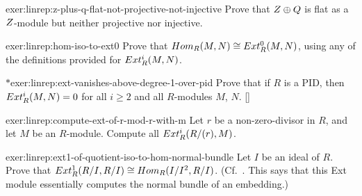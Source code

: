 \begin{exer}{}{exer:linrep:z-plus-q-flat-not-projective-not-injective}
  Prove that $Z \oplus Q$ is flat as a $Z$-module but neither
  projective nor injective.
\end{exer}

\begin{exer}{}{exer:linrep:hom-iso-to-ext0}
  Prove that $Hom_R(M, N) \cong Ext^0_R(M, N)$, using any of the
  definitions provided for $Ext^i_R(M, N)$.
\end{exer}

\begin{exer}{$*$}{exer:linrep:ext-vanishes-above-degree-1-over-pid}
  Prove that if $R$ is a PID, then $Ext^i_R(M, N) = 0$ for all
  $i \geq 2$ and all $R$-modules $M$,
  $N$. []
\end{exer}

\begin{exer}{}{exer:linrep:compute-ext-of-r-mod-r-with-m}
  Let $r$ be a non-zero-divisor in $R$, and let $M$ be an
  $R$-module. Compute all $Ext^i_R(R/(r), M)$.
\end{exer}

\begin{exer}{}{exer:linrep:ext1-of-quotient-iso-to-hom-normal-bundle}
  Let $I$ be an ideal of $R$. Prove that
  $Ext^1_R(R/I, R/I) \cong Hom_R(I/I^2, R/I)$.  (Cf.\
  . This says
  that this Ext module essentially computes the normal bundle of an
  embedding.)
\end{exer}

